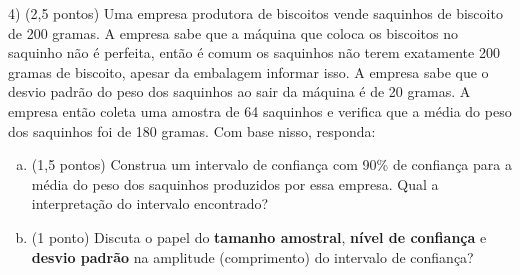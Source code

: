 \documentclass[12pt]{article}
\begin{document}
4) (2,5 pontos) Uma empresa produtora de biscoitos vende saquinhos de biscoito de 200 gramas. A empresa sabe que a máquina que coloca os biscoitos no saquinho 
não é perfeita, então é comum os saquinhos não terem exatamente 200 gramas de biscoito, apesar da embalagem informar isso. A empresa sabe 
que o desvio padrão do peso dos saquinhos ao sair da máquina é de 20 gramas. A empresa então coleta uma amostra de 64 saquinhos e verifica que 
a média do peso dos saquinhos foi de 180 gramas. Com base nisso, responda:

\begin{enumerate}[a)]  
    \item (1,5 pontos) Construa um intervalo de confiança com 90\% de confiança para a média do peso dos saquinhos produzidos por essa empresa. Qual a interpretação do intervalo encontrado? 
    \item (1 ponto) Discuta o papel do \textbf{tamanho amostral}, \textbf{nível de confiança} e \textbf{desvio padrão} na amplitude (comprimento) do intervalo de confiança?
\end{enumerate}
\end{document}
